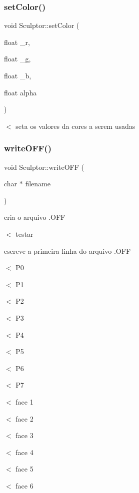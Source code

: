 \mbox{\label{classSculptor_a4e53f85ee03b729efafa985f72563c4b}} 
\subsubsection{\texorpdfstring{set\+Color()}{setColor()}}
{\footnotesize\ttfamily void Sculptor\+::set\+Color (\begin{DoxyParamCaption}\item[{float}]{\+\_\+r,  }\item[{float}]{\+\_\+g,  }\item[{float}]{\+\_\+b,  }\item[{float}]{alpha }\end{DoxyParamCaption})}

$<$ seta os valores da cores a serem usadas \mbox{\label{classSculptor_aa8ed61fc7cae10c4d7a895330fe5e309}} 
\subsubsection{\texorpdfstring{write\+O\+F\+F()}{writeOFF()}}
{\footnotesize\ttfamily void Sculptor\+::write\+O\+FF (\begin{DoxyParamCaption}\item[{char $\ast$}]{filename }\end{DoxyParamCaption})}

cria o arquivo .O\+FF

$<$ testar

escreve a primeira linha do arquivo .O\+FF

$<$ P0

$<$ P1

$<$ P2

$<$ P3

$<$ P4

$<$ P5

$<$ P6

$<$ P7

$<$ face 1

$<$ face 2

$<$ face 3

$<$ face 4

$<$ face 5

$<$ face 6 

